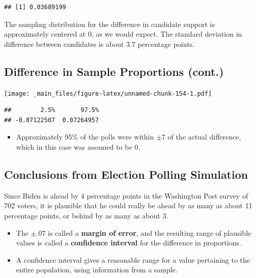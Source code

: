 \documentclass[]{book}
\newenvironment{Shaded}{\begin{snugshade}}{\end{snugshade}}
\newcommand{\KeywordTok}[1]{\textcolor[rgb]{0.13,0.29,0.53}{\textbf{#1}}}
\newcommand{\DecValTok}[1]{\textcolor[rgb]{0.00,0.00,0.81}{#1}}
\newcommand{\OperatorTok}[1]{\textcolor[rgb]{0.81,0.36,0.00}{\textbf{#1}}}
\newcommand{\NormalTok}[1]{#1}
\providecommand{\tightlist}{%
  \setlength{\itemsep}{0pt}\setlength{\parskip}{0pt}}
\begin{document}
\begin{verbatim}
## [1] 0.03689199
\end{verbatim}

The sampling distribution for the difference in candidate support is
approximately centered at 0, as we would expect. The standard deviation
in difference between candidates is about 3.7 percentage points.

\subsection{Difference in Sample Proportions
(cont.)}\label{difference-in-sample-proportions-cont.}

\texttt{[image: \_main\_files/figure-latex/unnamed-chunk-154-1.pdf]}

\begin{Shaded}
\end{Shaded}

\begin{verbatim}
##        2.5%       97.5% 
## -0.07122507  0.07264957
\end{verbatim}

\begin{itemize}
\tightlist
\item
  Approximately 95\% of the polls were within \(\pm 7\) of the actual
  difference, which in this case was assumed to be 0.
\end{itemize}

\subsection{Conclusions from Election Polling
Simulation}\label{conclusions-from-election-polling-simulation}

Since Biden is ahead by 4 percentage points in the Washington Post
survey of 702 voters, it is plausible that he could really be ahead by
as many as about 11 percentage points, or behind by as many as about 3.

\begin{itemize}
\item
  The \(\pm .07\) is called a \textbf{margin of error}, and the
  resulting range of plausible values is called a \textbf{confidence
  interval} for the difference in proportions.
\item
  A confidence interval gives a reasonable range for a value pertaining
  to the entire population, using information from a sample.
\end{itemize}
\end{document}
